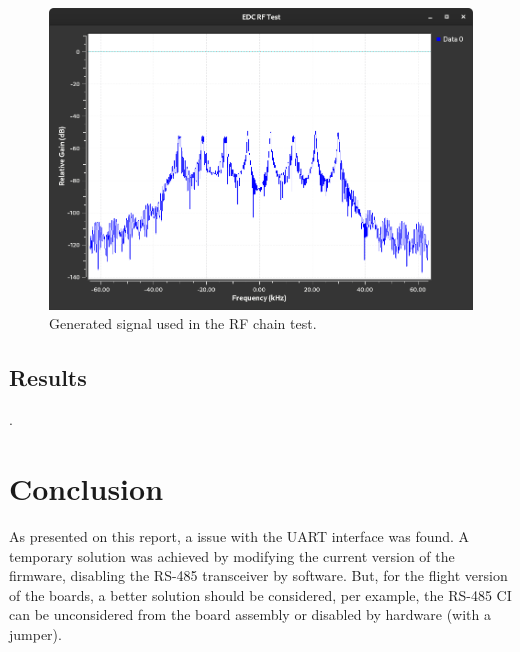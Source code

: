 \begin{figure}[!ht]
    \begin{center}
        \includegraphics[width=\textwidth]{figures/edc_report/edc-rf-test-signal}
        \caption{Generated signal used in the RF chain test.}
        \label{fig:edc-rf-signal}
    \end{center}
\end{figure}

\subsection{Results}

.

\section{Conclusion}

As presented on this report, a issue with the UART interface was found. A temporary solution was achieved by modifying the current version of the firmware, disabling the RS-485 transceiver by software. But, for the flight version of the boards, a better solution should be considered, per example, the RS-485 CI can be unconsidered from the board assembly or disabled by hardware (with a jumper).
